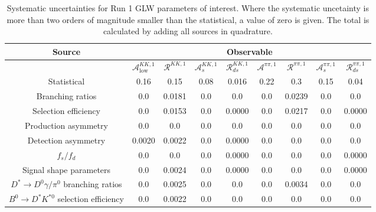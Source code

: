 \begin{sidewaystable}
  \centering
  \begin{tabular}{ccccccccc}
      \toprule
      Source & \multicolumn{8}{c}{Observable} \\
      \midrule
       & $\mathcal{A}_\mathrm{low}^{KK,1}$ & $\mathcal{R}^{KK,1}$ & $\mathcal{A}_s^{KK,1}$ & $\mathcal{R}_{ds}^{KK,1}$ & $\mathcal{A}^{\pi\pi,1}$ & $\mathcal{R}^{\pi\pi,1}$ & $\mathcal{A}_s^{\pi\pi,1}$ & $\mathcal{R}_{ds}^{\pi\pi,1}$ \\
      \midrule
      Statistical & 0.16 & 0.15 & 0.08 & 0.016 & 0.22 & 0.3 & 0.15 & 0.04 \\
      \midrule
      Branching ratios & 0.0  & 0.0181 & 0.0  & 0.0  & 0.0  & 0.0239 & 0.0  & 0.0  \\
      Selection efficiency & 0.0  & 0.0153 & 0.0  & 0.0000 & 0.0  & 0.0217 & 0.0  & 0.0000 \\
      Production asymmetry & 0.0  & 0.0  & 0.0  & 0.0  & 0.0  & 0.0  & 0.0  & 0.0  \\
      Detection asymmetry & 0.0020 & 0.0022 & 0.0  & 0.0000 & 0.0  & 0.0  & 0.0  & 0.0  \\
      $f_s/f_d$ & 0.0  & 0.0  & 0.0  & 0.0000 & 0.0  & 0.0  & 0.0  & 0.0000 \\
      Signal shape parameters & 0.0  & 0.0024 & 0.0  & 0.0000 & 0.0  & 0.0  & 0.0  & 0.0000 \\
      $D^* \to D^0 \gamma/\pi^0$ branching ratios & 0.0  & 0.0025 & 0.0  & 0.0  & 0.0  & 0.0034 & 0.0  & 0.0  \\
      $B^0 \to D^* K^{*0}$ selection efficiency & 0.0  & 0.0022 & 0.0  & 0.0  & 0.0  & 0.0  & 0.0  & 0.0  \\
      \bottomrule
  \end{tabular}
  \caption{Systematic uncertainties for Run 1 GLW parameters of interest. Where the systematic uncetainty is more than two orders of magnitude smaller than the statistical, a value of zero is given. The total is calculated by adding all sources in quadrature.}
\label{tab:KK_run1_systematics}
\end{sidewaystable}
